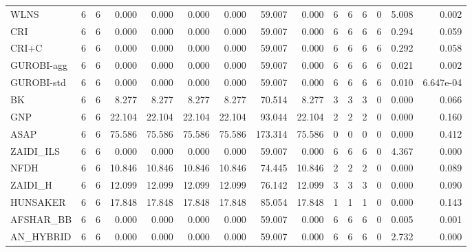 \begin{table}[htbp]
\begin{tabular}{lrrrrrrrrrrrrrr}
WLNS & 6 & 6 & 0.000 & 0.000 & 0.000 & 0.000 & 59.007 & 0.000 & 6 & 6 & 6 & 0 & 5.008 & 0.002 \\
CRI & 6 & 6 & 0.000 & 0.000 & 0.000 & 0.000 & 59.007 & 0.000 & 6 & 6 & 6 & 6 & 0.294 & 0.059 \\
CRI+C & 6 & 6 & 0.000 & 0.000 & 0.000 & 0.000 & 59.007 & 0.000 & 6 & 6 & 6 & 6 & 0.292 & 0.058 \\
GUROBI-agg & 6 & 6 & 0.000 & 0.000 & 0.000 & 0.000 & 59.007 & 0.000 & 6 & 6 & 6 & 6 & 0.021 & 0.002 \\
GUROBI-std & 6 & 6 & 0.000 & 0.000 & 0.000 & 0.000 & 59.007 & 0.000 & 6 & 6 & 6 & 6 & 0.010 & 6.647e-04 \\
BK & 6 & 6 & 8.277 & 8.277 & 8.277 & 8.277 & 70.514 & 8.277 & 3 & 3 & 3 & 0 & 0.000 & 0.066 \\
GNP & 6 & 6 & 22.104 & 22.104 & 22.104 & 22.104 & 93.044 & 22.104 & 2 & 2 & 2 & 0 & 0.000 & 0.160 \\
ASAP & 6 & 6 & 75.586 & 75.586 & 75.586 & 75.586 & 173.314 & 75.586 & 0 & 0 & 0 & 0 & 0.000 & 0.412 \\
ZAIDI\_ILS & 6 & 6 & 0.000 & 0.000 & 0.000 & 0.000 & 59.007 & 0.000 & 6 & 6 & 6 & 0 & 4.367 & 0.000 \\
NFDH & 6 & 6 & 10.846 & 10.846 & 10.846 & 10.846 & 74.445 & 10.846 & 2 & 2 & 2 & 0 & 0.000 & 0.089 \\
ZAIDI\_H & 6 & 6 & 12.099 & 12.099 & 12.099 & 12.099 & 76.142 & 12.099 & 3 & 3 & 3 & 0 & 0.000 & 0.090 \\
HUNSAKER & 6 & 6 & 17.848 & 17.848 & 17.848 & 17.848 & 85.054 & 17.848 & 1 & 1 & 1 & 0 & 0.000 & 0.143 \\
AFSHAR\_BB & 6 & 6 & 0.000 & 0.000 & 0.000 & 0.000 & 59.007 & 0.000 & 6 & 6 & 6 & 0 & 0.005 & 0.001 \\
AN\_HYBRID & 6 & 6 & 0.000 & 0.000 & 0.000 & 0.000 & 59.007 & 0.000 & 6 & 6 & 6 & 0 & 2.732 & 0.000 \\
\bottomrule
\end{tabular}
\end{table}
